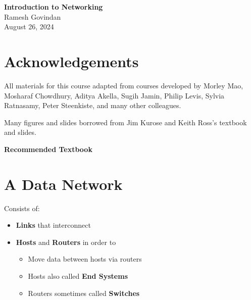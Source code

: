 \documentclass[9pt]{extarticle}
\begin{document}
\small
\begin{multicols*}{3}
\begin{center}
    {\Large\textbf{Introduction to Networking}}\\
    Ramesh Govindan\\
    August 26, 2024
\end{center}

{\color{sectioncolor}\section*{\centering Acknowledgements}}
All materials for this course adapted from courses developed by Morley Mao, Mosharaf Chowdhury, Aditya Akella, Sugih Jamin, Philip Levis, Sylvia Ratnasamy, Peter Steenkiste, and many other colleagues.

Many figures and slides borrowed from Jim Kurose and Keith Ross's textbook and slides.

\textbf{Recommended Textbook}

{\color{sectioncolor}\section*{\centering A Data Network}}
Consists of:
\begin{itemize}
    \item \textbf{Links} that interconnect
    \item \textbf{Hosts} and \textbf{Routers} in order to
    \begin{itemize}
        \item Move data between hosts via routers
        \item Hosts also called \textbf{End Systems}
        \item Routers sometimes called \textbf{Switches}
    \end{itemize}
\end{itemize}

\begin{center}
\end{center}


\end{multicols*}
\end{document}

